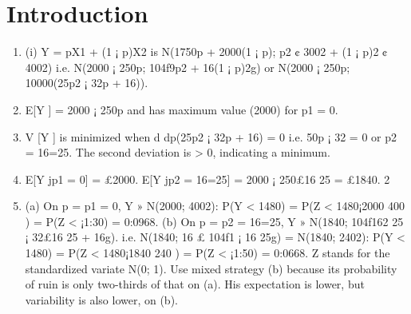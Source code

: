 \documentclass{article}
\begin{document}
\section{Introduction}
\begin{enumerate}
\item (i) Y = pX1 + (1 ¡ p)X2 is N(1750p + 2000(1 ¡ p); p2 ¢ 3002 + (1 ¡ p)2 ¢ 4002)
i.e. N(2000 ¡ 250p; 104f9p2 + 16(1 ¡ p)2g)
or N(2000 ¡ 250p; 10000(25p2 ¡ 32p + 16)).
\item E[Y ] = 2000 ¡ 250p and has maximum value (2000) for p1 = 0.
\item V [Y ] is minimized when d
dp(25p2 ¡ 32p + 16) = 0
i.e. 50p ¡ 32 = 0 or p2 = 16=25.
The second deviation is > 0, indicating a minimum.
\item  E[Y jp1 = 0] = £2000. E[Y jp2 = 16=25] = 2000 ¡ 250£16
25 = £1840.
2
\item  (a) On p = p1 = 0, Y » N(2000; 4002):
P(Y < 1480) = P(Z < 1480¡2000
400 ) = P(Z < ¡1:30) = 0:0968.
(b) On p = p2 = 16=25, Y » N(1840; 104f162
25 ¡ 32£16
25 + 16g).
i.e. N(1840; 16 £ 104f1 ¡ 16
25g) = N(1840; 2402):
P(Y < 1480) = P(Z < 1480¡1840
240 ) = P(Z < ¡1:50) = 0:0668.
Z stands for the standardized variate N(0; 1). Use mixed strategy (b) because
its probability of ruin is only two-thirds of that on (a). His expectation
is lower, but variability is also lower, on (b).
\end{enumerate}
\end{document}
